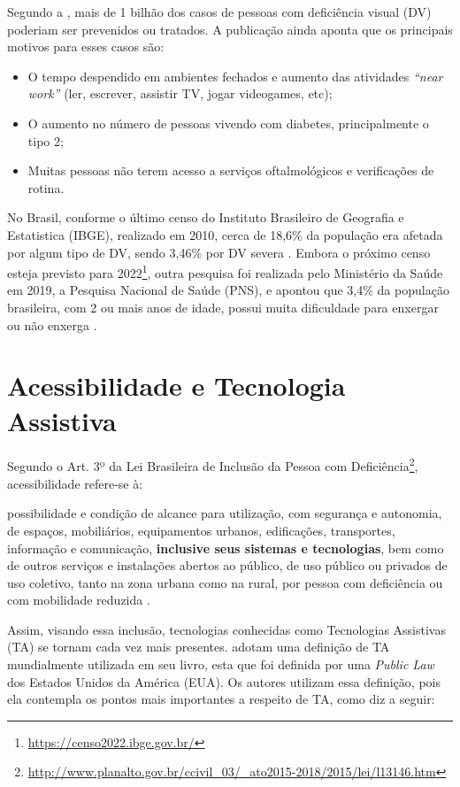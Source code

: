 Segundo a , mais de 1 bilhão dos casos de pessoas com deficiência visual (DV) poderiam ser prevenidos ou
tratados. A publicação ainda aponta que os principais motivos para esses casos são:

\begin{itemize}
    \item O tempo despendido em ambientes fechados e aumento das atividades \textit{``near work''} (ler, escrever, assistir TV, jogar videogames, etc);
    \item O aumento no número de pessoas vivendo com diabetes, principalmente o tipo 2;
    \item Muitas pessoas não terem acesso a serviços oftalmológicos e verificações de rotina.
\end{itemize}

No Brasil, conforme o último censo do Instituto Brasileiro de Geografia e Estatistica (IBGE), realizado em 2010,
cerca de 18,6\% da população era afetada por algum tipo de DV, sendo 3,46\% por DV severa
\cite{IBGE2012}. Embora o próximo censo esteja previsto para 2022\footnote{\url{https://censo2022.ibge.gov.br/}}, outra pesquisa
foi realizada pelo Ministério da Saúde em 2019, a Pesquisa Nacional de Saúde (PNS), e apontou que 3,4\% da população brasileira,
com 2 ou mais anos de idade, possui muita dificuldade para enxergar ou não enxerga \cite{stopa2020pesquisa}.

\section{Acessibilidade e Tecnologia Assistiva}

Segundo o Art. 3º da Lei Brasileira de Inclusão da Pessoa com Deficiência\footnote{\url{http://www.planalto.gov.br/ccivil_03/_ato2015-2018/2015/lei/l13146.htm}},
acessibilidade refere-se à:

\begin{citacao}
    possibilidade e condição de alcance para utilização, com segurança e autonomia, de espaços, mobiliários, equipamentos urbanos,
    edificações, transportes, informação e comunicação, \textbf{inclusive seus sistemas e tecnologias}, bem como de outros serviços e
    instalações abertos ao público, de uso público ou privados de uso coletivo, tanto na zona urbana como na rural, por pessoa com
    deficiência ou com mobilidade reduzida \cite{Brasil2015}.
\end{citacao}

Assim, visando essa inclusão, tecnologias conhecidas como Tecnologias Assistivas (TA) se tornam cada vez mais presentes.
 adotam uma definição de TA mundialmente utilizada em seu livro, esta que foi definida por uma \textit{Public Law}
dos Estados Unidos da América (EUA). Os autores utilizam essa definição, pois ela contempla os pontos mais
importantes a respeito de TA, como diz a seguir:

